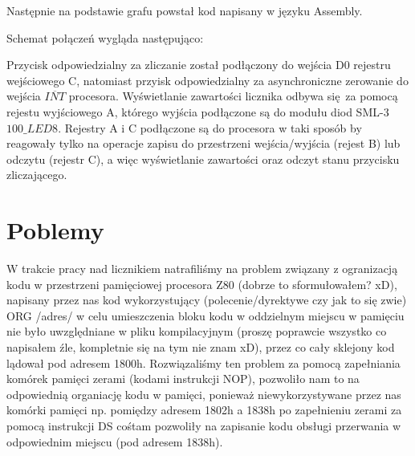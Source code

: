 \documentclass[fleqn]{article}
\begin{document}
Następnie na podstawie grafu powstał kod napisany w języku Assembly.


Schemat połączeń wygląda następująco:


Przycisk odpowiedzialny za zliczanie został podłączony do wejścia D0 rejestru wejściowego C, natomiast przyisk odpowiedzialny za asynchroniczne zerowanie do wejścia $\overline{INT}$ procesora.
Wyświetlanie zawartości licznika odbywa się za pomocą rejestu wyjściowego A, którego wyjścia podłączone są do modułu diod SML-3 $\textit{100\_LED8}$. Rejestry A i C podłączone są do procesora w taki sposób by reagowały tylko na operacje zapisu do przestrzeni wejścia/wyjścia (rejest B) lub odczytu (rejestr C), a więc wyświetlanie zawartości oraz odczyt stanu przycisku zliczającego.


\section{Poblemy}
W trakcie pracy nad licznikiem natrafiliśmy na problem związany z ogranizacją kodu w przestrzeni pamięciowej procesora Z80 (dobrze to sformułowałem? xD), napisany przez nas kod wykorzystujący (polecenie/dyrektywe czy jak to się zwie) ORG /adres/ w celu umieszczenia bloku kodu w oddzielnym miejscu w pamięciu nie było uwzględniane w pliku kompilacyjnym (proszę poprawcie wszystko co napisałem źle, kompletnie się na tym nie znam xD), przez co cały sklejony kod lądował pod adresem 1800h. Rozwiązaliśmy ten problem za pomocą zapełniania komórek pamięci zerami (kodami instrukcji NOP), pozwoliło nam to na odpowiednią organiację kodu w pamięci, ponieważ niewykorzystywane przez nas komórki pamięci np. pomiędzy adresem 1802h a 1838h po zapełnieniu zerami za pomocą instrukcji DS cośtam pozwoliły na zapisanie kodu obsługi przerwania w odpowiednim miejscu (pod adresem 1838h).
\end{document}
